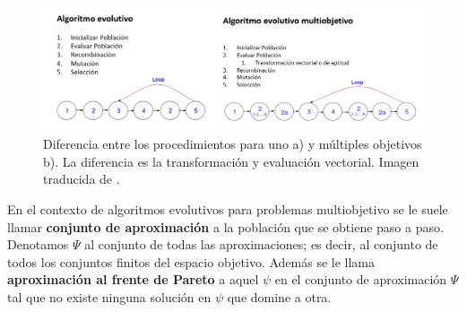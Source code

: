 \begin{figure}[H]
    \centering
    \includegraphics[width=\textwidth]{Figuras/MOEA_EA.png}
    \caption[EMOAs vs EAs]{Diferencia entre los procedimientos para uno a) y múltiples objetivos b). La diferencia es la transformación y evaluación vectorial. Imagen traducida de \cite{coelloEvolutionaryAlgorithmsSolving}.}
    \label{fig:EMOA_EA}
\end{figure}


En el contexto de algoritmos evolutivos para problemas multiobjetivo se le suele llamar \textbf{conjunto de aproximación} a la población que se obtiene paso a paso. Denotamos $\Psi$ al conjunto de todas las aproximaciones; es decir, al conjunto de todos los conjuntos finitos del espacio objetivo. Además se le llama \textbf{aproximación al frente de Pareto} a aquel $\psi$ en el conjunto de aproximación $\Psi$ tal que no existe ninguna solución en $\psi$ que domine a otra. 




